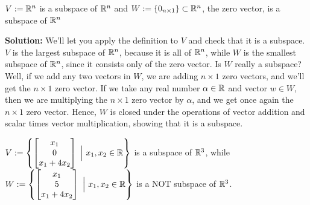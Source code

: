 \begin{example}
\label{ex:Subspace02}
$V:=\mathbb R^n$ is a subspace of $\mathbb R^n$ and $W:=\{  0_{n \times 1} \} \subset \mathbb R^n$, the zero vector, is a subspace of $\mathbb R^n$
\end{example}

\textbf{Solution:} We'll let you apply the definition to $V$ and check that it is a subspace. $V$ is the largest subspace of $\mathbb R^n$, because it is all of $\mathbb R^n$, while $W$ is the smallest subspace of $\mathbb R^n$, since it consists only of the zero vector. Is $W$ really a subspace? Well, if we add any two vectors in $W$, we are adding $n \times 1$ zero vectors, and we'll get the $n \times 1$ zero vector. If we take any real number $\alpha \in \mathbb R$ and vector $w\in W$, then we are multiplying the $n \times 1$ zero vector by $\alpha$, and we get once again the $n \times 1$ zero vector. Hence, $W$ is closed under the operations of vector addition and scalar times vector multiplication, showing that it is a subspace. \Qed

\begin{example}
\label{ex:Subspace03}
$V:=\left\{ \begin{bmatrix} x_1 \\ 0 \\  x_1+ 4 x_2\end{bmatrix}~ \Big| ~ x_1, x_2 \in \mathbb R \right\}$ is a subspace of $\mathbb R^3$, while $W:=\left\{ \begin{bmatrix} x_1 \\ 5 \\ x_1+ 4 x_2 \end{bmatrix}~ \Big| ~ x_1, x_2 \in \mathbb R \right\}$ is a NOT subspace of $\mathbb R^3$. 
\end{example}


